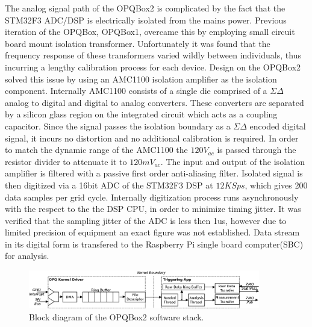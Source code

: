 The analog signal path of the OPQBox2 is complicated by the fact that the STM32F3 ADC/DSP is electrically isolated from the mains power. Previous iteration of the OPQBox, OPQBox1, overcame this by employing small circuit board mount isolation transformer. Unfortunately it was found that the frequency response of these transformers varied wildly between individuals, thus incurring a lengthy calibration process for each device. Design on the OPQBox2 solved this issue by using an AMC1100 isolation amplifier as the isolation component. Internally AMC1100 consists of a single die comprised of a $\Sigma\Delta$ analog to digital and digital to analog converters. These converters are separated by a silicon glass region on the integrated circuit which acts as a coupling capacitor. Since the signal passes the isolation boundary as a $\Sigma\Delta$ encoded digital signal, it incurs no distortion and no additional calibration is required. In order to match the dynamic range of the AMC1100 the $120V_{ac}$ is passed through the resistor divider to attenuate it to $120mV_{ac}$. The input and output of the isolation amplifier is filtered with a passive first order anti-aliasing filter. Isolated signal is then digitized via a 16bit ADC of the STM32F3 DSP at $12 KSps$, which gives 200 data samples per grid cycle. Internally digitization process runs asynchronously with the respect to the the DSP CPU, in order to minimize timing jitter. It was verified that the sampling jitter of the ADC is less then 1us, however due to limited precision of equipment an exact figure was not established. Data stream in its digital form is transfered to the Raspberry Pi single board computer(SBC) for analysis.

\begin{figure}[h]
  \begin{center}
  \includegraphics[width=0.9\textwidth]{img/opqbox_software.png}
  \end{center}
  \caption{Block diagram of the OPQBox2 software stack.}
  \label{fig:3}
\end{figure}

